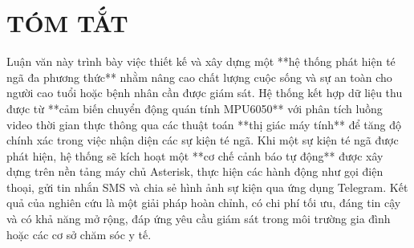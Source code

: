 \chapter*{TÓM TẮT}

Luận văn này trình bày việc thiết kế và xây dựng một **hệ thống phát hiện té ngã đa phương thức** nhằm nâng cao chất lượng cuộc sống và sự an toàn cho người cao tuổi hoặc bệnh nhân cần được giám sát. Hệ thống kết hợp dữ liệu thu được từ **cảm biến chuyển động quán tính MPU6050** với phân tích luồng video thời gian thực thông qua các thuật toán **thị giác máy tính** để tăng độ chính xác trong việc nhận diện các sự kiện té ngã. Khi một sự kiện té ngã được phát hiện, hệ thống sẽ kích hoạt một **cơ chế cảnh báo tự động** được xây dựng trên nền tảng máy chủ Asterisk, thực hiện các hành động như gọi điện thoại, gửi tin nhắn SMS và chia sẻ hình ảnh sự kiện qua ứng dụng Telegram. Kết quả của nghiên cứu là một giải pháp hoàn chỉnh, có chi phí tối ưu, đáng tin cậy và có khả năng mở rộng, đáp ứng yêu cầu giám sát trong môi trường gia đình hoặc các cơ sở chăm sóc y tế.
